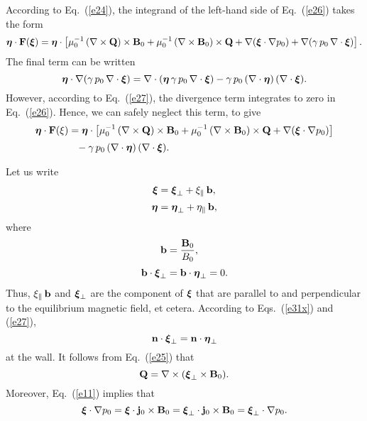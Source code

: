 \documentclass[12pt,prb,aps,notitlepage]{revtex4-1}
\newcommand{\bxi}{\mbox{\boldmath$\xi$}}
\newcommand{\bta}{\mbox{\boldmath$\eta$}}
\begin{document}
According to Eq.~(\ref{e24}), the integrand of the left-hand side of Eq.~(\ref{e26}) takes the form 
\begin{equation}
\bta\cdot {\bf F}(\bxi)= \bta\cdot\left[ \mu_0^{-1}\,(\nabla\times {\bf Q})\times{\bf B}_0+ \mu_0^{-1}\, (\nabla\times {\bf B}_0)\times {\bf Q}
+\nabla(\bxi\cdot\nabla p_0) + \nabla(\gamma\,p_0\,\nabla\cdot\bxi)\right].
\end{equation}
The final term can be written
\begin{equation}
\bta\cdot \nabla(\gamma\,p_0\,\nabla\cdot\bxi)= \nabla\cdot (\bta\,\gamma\,p_0\,\nabla\cdot\bxi)-\gamma\,p_0\,(\nabla\cdot\bta)\,(\nabla\cdot\bxi).
\end{equation}
However, according to Eq.~(\ref{e27}), the divergence term integrates to zero in Eq.~(\ref{e26}). Hence, we can safely neglect this term, 
to give 
\begin{align}
\bta\cdot {\bf F}(\xi)&= \bta\cdot\left[ \mu_0^{-1}\,(\nabla\times {\bf Q})\times{\bf B}_0+ \mu_0^{-1}\, (\nabla\times {\bf B}_0)\times {\bf Q}
+\nabla(\bxi\cdot\nabla p_0)\right]\nonumber\\[0.5ex]
&\phantom{=} -\gamma\,p_0\,(\nabla\cdot\bta)\,(\nabla\cdot\bxi).\label{e31}
\end{align}

Let us write
\begin{align}\label{e32}
\bxi &=\bxi_\perp + \xi_\parallel\,{\bf b},\\[0.5ex]
\bta&=\bta_\perp+\eta_\parallel\,{\bf b},\label{e33x}
\end{align}
where 
\begin{align}
{\bf b} &=\frac{{\bf B}_0}{B_0},\\[0.5ex]
{\bf b} \cdot\bxi_\perp &= {\bf b}\cdot\bta_\perp = 0.
\end{align}
Thus, $\xi_\parallel\,{\bf b}$ and $\bxi_\perp$ are the component of $\bxi$ that are parallel to and perpendicular to the equilibrium magnetic field, et cetera.
According to Eqs.~(\ref{e31x}) and (\ref{e27}),
\begin{equation}\label{ecc}
{\bf n}\cdot\bxi_\perp = {\bf n}\cdot\bta_\perp
\end{equation}
at the wall. 
It follows from Eq.~(\ref{e25}) that
\begin{equation}\label{e36}
{\bf Q} = \nabla\times (\bxi_\perp\times {\bf B}_0).
\end{equation}
Moreover, Eq.~(\ref{e11}) implies that
\begin{equation}\label{e37}
\bxi\cdot\nabla p_0 = \bxi\cdot{\bf j}_0\times {\bf B}_0= \bxi_\perp\cdot{\bf j}_0\times {\bf B}_0= \bxi_\perp\cdot\nabla p_0.
\end{equation}
\end{document}
